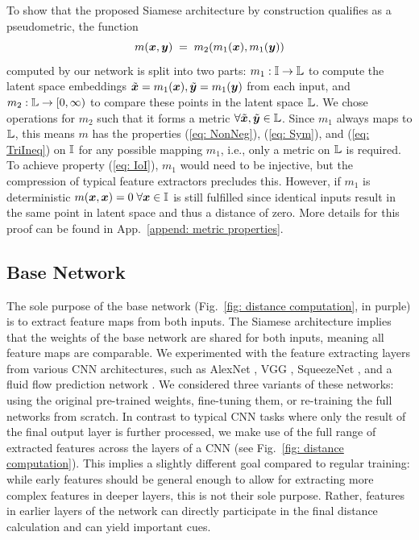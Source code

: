 \documentclass{article}
\begin{document}
To show that the proposed Siamese architecture by construction qualifies as a pseudometric, the function 
\begin{equation*}
    m({\bm{x}},{\bm{y}}) \;=\; m_2( m_1({\bm{x}}), m_1({\bm{y}}) )
\end{equation*}
computed by our network is split into two parts: $m_1 : {\mathbb{I}} \to {\mathbb{L}}$ to compute the latent space embeddings $\tilde{{\bm{x}}} = m_1({\bm{x}}), \tilde{{\bm{y}}} = m_1({\bm{y}})$ from each input, and $m_2 : {\mathbb{L}} \to [0, \infty)$ to compare these points in the latent space ${\mathbb{L}}$. We chose operations for $m_2$ such that it forms a metric $\forall \tilde{{\bm{x}}}, \tilde{{\bm{y}}} \in {\mathbb{L}}$. Since $m_1$ always maps to ${\mathbb{L}}$, this means $m$ has the properties (\ref{eq: NonNeg}), (\ref{eq: Sym}), and (\ref{eq: TriIneq}) on ${\mathbb{I}}$ for any possible mapping $m_1$, i.e., only a metric on ${\mathbb{L}}$ is required. To achieve property (\ref{eq: IoI}), $m_1$ would need to be injective, but the compression of typical feature extractors precludes this. However, if $m_1$ is deterministic $m({\bm{x}}, {\bm{x}}) = 0 \; \forall {\bm{x}} \in {\mathbb{I}}$ is still fulfilled since identical inputs result in the same point in latent space and thus a distance of zero. More details for this proof can be found in App.~\ref{append: metric properties}.

\subsection{Base Network}
The sole purpose of the base network (Fig.~\ref{fig: distance computation}, in purple) is to extract feature maps from both inputs. The Siamese architecture implies that the weights of the base network are shared for both inputs, meaning all feature maps are comparable. We experimented with the feature extracting layers from various CNN architectures, such as AlexNet \citep{krizhevsky2017}, VGG \citep{simonyan2015}, SqueezeNet \citep{iandola2016}, and a fluid flow prediction network \citep{thuerey2018}. We considered three variants of these networks: using the original pre-trained weights, fine-tuning them, or re-training the full networks from scratch. In contrast to typical CNN tasks where only the result of the final output layer is further processed, we make use of the full range of extracted features across the layers of a CNN (see Fig.~\ref{fig: distance computation}). This implies a slightly different goal compared to regular training: while early features should be general enough to allow for extracting more complex features in deeper layers, this is not their sole purpose. Rather, features in earlier layers of the network can directly participate in the final distance calculation and can yield important cues.
\end{document}
